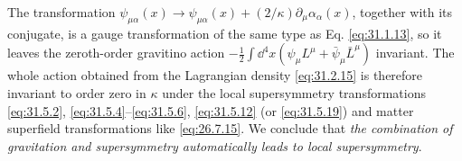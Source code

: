 The transformation
\(\psi_{\mu\alpha}(x)\longrightarrow\psi_{\mu\alpha}(x)
 +(2/\kappa)\partial_\mu\alpha_\alpha(x)\), together with its conjugate,
is a gauge transformation of the same type as Eq. \eqref{eq:31.1.13},
so it leaves the zeroth-order gravitino action
\(-\frac{1}{2}\int \dd^4x
(\psi_\mu L^\mu+\bar\psi_\mu\bar L^\mu)\) invariant. The whole action
obtained from the Lagrangian density \eqref{eq:31.2.15} is therefore
invariant to order zero in \(\kappa\) under the local supersymmetry
transformations \eqref{eq:31.5.2}, \eqref{eq:31.5.4}--\eqref{eq:31.5.6},
\eqref{eq:31.5.12} (or \eqref{eq:31.5.19}) and matter superfield
transformations like \eqref{eq:26.7.15}. We conclude that
\emph{the combination of gravitation and supersymmetry automatically
leads to local supersymmetry}.
